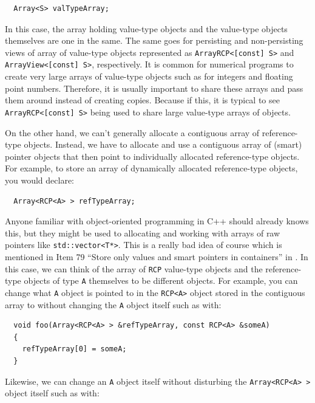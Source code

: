 \documentclass[pdf,ps2pdf,11pt]{SANDreport}
\begin{document}
{\small\begin{verbatim}
  Array<S> valTypeArray;
\end{verbatim}}

In this case, the array holding value-type objects and the value-type
objects themselves are one in the same.  The same goes for persisting
and non-persisting views of array of value-type objects represented as
{}\texttt{ArrayRCP<[const] S>} and {}\texttt{ArrayView<[const] S>},
respectively.  It is common for numerical programs to create very
large arrays of value-type objects such as for integers and floating
point numbers.  Therefore, it is usually important to share these
arrays and pass them around instead of creating copies.  Because if
this, it is typical to see {}\texttt{ArrayRCP<[const] S>} being used
to share large value-type arrays of objects.

On the other hand, we can't generally allocate a contiguous array of
reference-type objects.  Instead, we have to allocate and use a
contiguous array of (smart) pointer objects that then point to
individually allocated reference-type objects.  For example, to store
an array of dynamically allocated reference-type objects, you would
declare:

{\small\begin{verbatim}
  Array<RCP<A> > refTypeArray;
\end{verbatim}}

Anyone familiar with object-oriented programming in C++ should already
knows this, but they might be used to allocating and working with
arrays of raw pointers like {}\texttt{std::vector<T*>}.  This is a
really bad idea of course which is mentioned in Item 79 ``Store only
values and smart pointers in containers'' in
{}\cite{C++CodingStandards05}.  In this case, we can think of the
array of {}\texttt{RCP} value-type objects and the reference-type
objects of type {}\texttt{A} themselves to be different objects.  For
example, you can change what {}\texttt{A} object is pointed to in the
{}\texttt{RCP<A>} object stored in the contiguous array to without
changing the {}\texttt{A} object itself such as with:

{\small\begin{verbatim}
  void foo(Array<RCP<A> > &refTypeArray, const RCP<A> &someA)
  {
    refTypeArray[0] = someA;
  }
\end{verbatim}}

Likewise, we can change an {}\texttt{A} object itself without
disturbing the {}\texttt{Array<RCP<A> >} object itself such as with:
\end{document}
